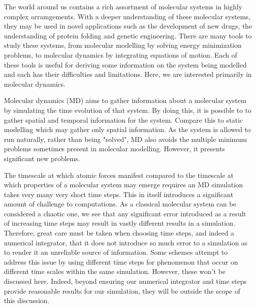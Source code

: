 %
%


The world around us contains
a rich assortment of molecular systems
in highly complex arramgements.
%
With a deeper understanding of these molecular systems,
they may be used in novel applications
such as the development of new drugs,
the understanding of protein folding and
genetic engineering.
%
There are many tools to study these systems,
from molecular modelling by solving energy minimization problems,
to molecular dynamics by integrating equations of motion.
%
Each of these tools is useful for deriving some information on
the system being modelled and each has their difficulties and limitations.
%
Here, we are interested primarily in molecular dynamics.

Molecular dynamics (MD) aims to gather information
about a molecular system by simulating the time evolution of
that system.
%
By doing this, it is possible to to gather
spatial and temporal information for the system.
%
Compare this to static modelling which may gather only spatial information.
%
As the system is allowed to run naturally, rather than being "solved",
MD also avoids the multiple minimum problems
sometimes present in molecular modelling.
%
However, it presents significant new problems.

The timescale at which atomic forces manifest compared to the timescale at
which properties of a molecular system may emerge requires an MD simulation
takes very many very short time steps.
%
This in itself introduces a significant amount of challenge to computations.
%
As a classical molecular system can be considered a chaotic one, we see
that any significant error introduced as a result of increasing time steps
may result in vastly different results in a simulation.
%
Therefore, great care must be taken when choosing time steps, and indeed
a numerical integrator, that it does not introduce so much error to a
simulation as to render it an unreliable source of information.
%
Some schemes attempt to address this issue by using different time steps
for phenomenon that occur on different time scales within the same simulation.
%
However, these won't be discussed here.
%
Indeed, beyond ensuring our numerical integrator and time steps provide
reasonable results for our simulation, they will be outside the scope
of this discussion.

